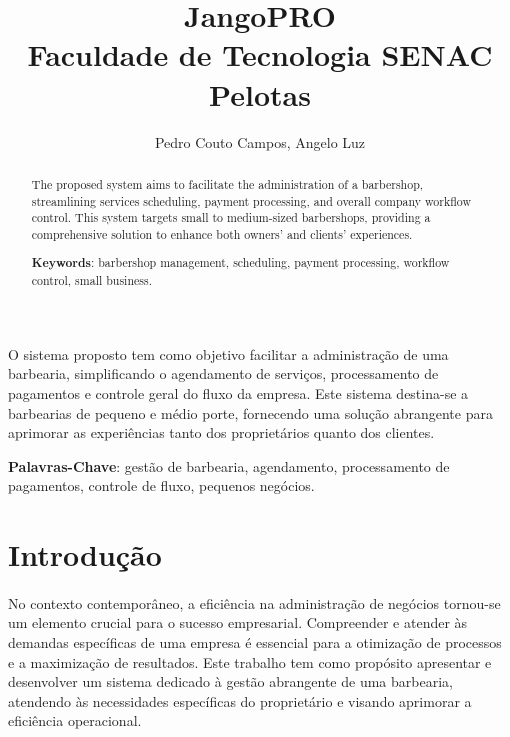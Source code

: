 \documentclass[12pt]{article}
\title{JangoPRO\\Faculdade de Tecnologia SENAC Pelotas}
\author{Pedro Couto Campos\inst{1}, Angelo Luz\inst{1}}
\begin{document}
 

\maketitle

\begin{abstract}
  The proposed system aims to facilitate the administration of a barbershop, streamlining services scheduling, payment processing, and overall company workflow control. This system targets small to medium-sized barbershops, providing a comprehensive solution to enhance both owners' and clients' experiences.

  \textbf{Keywords}: barbershop management, scheduling, payment processing, workflow control, small business.
\end{abstract}

\begin{resumo} 
  O sistema proposto tem como objetivo facilitar a administração de uma barbearia, simplificando o agendamento de serviços, processamento de pagamentos e controle geral do fluxo da empresa. Este sistema destina-se a barbearias de pequeno e médio porte, fornecendo uma solução abrangente para aprimorar as experiências tanto dos proprietários quanto dos clientes.

  \textbf{Palavras-Chave}: gestão de barbearia, agendamento, processamento de pagamentos, controle de fluxo, pequenos negócios.
\end{resumo}


\section{Introdução} 


\paragraph{}No contexto contemporâneo, a eficiência na administração de negócios tornou-se um elemento crucial para o sucesso empresarial. Compreender e atender às demandas específicas de uma empresa é essencial para a otimização de processos e a maximização de resultados. Este trabalho tem como propósito apresentar e desenvolver um sistema dedicado à gestão abrangente de uma barbearia, atendendo às necessidades específicas do proprietário e visando aprimorar a eficiência operacional.
\end{document}
